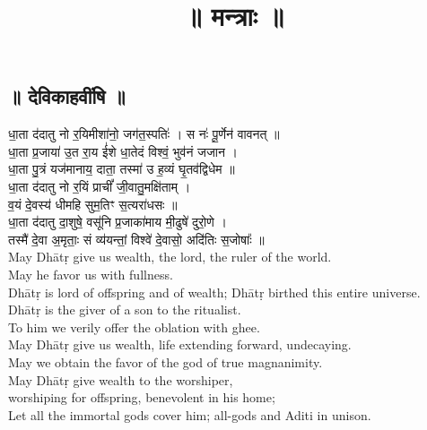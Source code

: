 \documentclass[11pt]{article}
\title{\textbf{ {\skt ॥ मन्त्राः ॥ }}}
\author{}
\date{}
\begin{document}
\begin{center}
	\section{{\Large\skts ॥ देविकाहवींषि ॥}}
\end{center}
\begin{adjustwidth}{6em}{.2em}
	{\large\skts\color{deepblue}
धा॒ता द॑दातु नो र॒यिमीशा॑नो॒ जग॑त॒स्पतिः॑ । स नः॑ पू॒र्णेन॑ वावनत् ॥ \\
धा॒ता प्र॒जाया॑ उ॒त रा॒य ई॑शे धा॒तेदं विश्वं॒ भुव॑नं जजान । \\
धा॒ता पु॒त्रं यज॑मानाय॒ दाता॒ तस्मा॑ उ ह॒व्यं घृ॒तव॑द्विधेम ॥ \\
धा॒ता द॑दातु नो र॒यिं प्राचीं᳚ जी॒वातु॒मक्षि॑ताम् । \\
व॒यं दे॒वस्य॑ धीमहि सुम॒तिꣳ स॒त्यरा॑धसः ॥\\
धा॒ता द॑दातु दा॒शुषे॒ वसू॑नि प्र॒जाका॑माय मी॒ढुषे॑ दुरो॒णे ।\\
तस्मै॑ दे॒वा अ॒मृताः॒ सं व्य॑यन्तां॒ विश्वे॑ दे॒वासो॒ अदि॑तिः स॒जोषाः᳚ ॥
}\\[5pt]
May Dhātṛ give us wealth, the lord, the ruler of the world.\\
May he favor us with fullness.\\
Dhātṛ is lord of offspring and of wealth; Dhātṛ birthed this entire universe.\\
Dhātṛ is the giver of a son to the ritualist.\\
To him we verily offer the oblation with ghee.\\
May Dhātṛ give us wealth, life extending forward, undecaying.\\
May we obtain the favor of the god of true magnanimity.\\
May Dhātṛ give wealth to the worshiper,\\
worshiping for offspring, benevolent in his home;\\
Let all the immortal gods cover him; all-gods and Aditi in unison.\\[10pt]


\end{adjustwidth}
\end{document}
